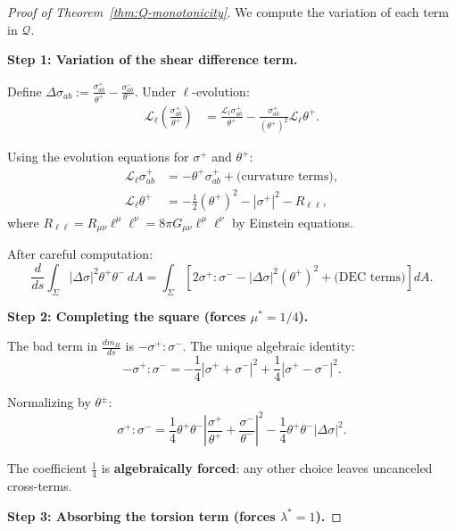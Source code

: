 \begin{proof}[Proof of Theorem~\ref{thm:Q-monotonicity}]
We compute the variation of each term in $\mathcal{Q}$.

\textbf{Step 1: Variation of the shear difference term.}

Define $\Delta\sigma_{ab} := \frac{\sigma^+_{ab}}{\theta^+} - \frac{\sigma^-_{ab}}{\theta^-}$. Under $\ell$-evolution:
\begin{align}
\mathcal{L}_\ell\left(\frac{\sigma^+_{ab}}{\theta^+}\right) &= \frac{\mathcal{L}_\ell\sigma^+_{ab}}{\theta^+} - \frac{\sigma^+_{ab}}{(\theta^+)^2}\mathcal{L}_\ell\theta^+.
\end{align}

Using the evolution equations for $\sigma^+$ and $\theta^+$:
\begin{align}
\mathcal{L}_\ell\sigma^+_{ab} &= -\theta^+\sigma^+_{ab} + \text{(curvature terms)}, \\
\mathcal{L}_\ell\theta^+ &= -\frac{1}{2}(\theta^+)^2 - |\sigma^+|^2 - R_{\ell\ell},
\end{align}
where $R_{\ell\ell} = R_{\mu\nu}\ell^\mu\ell^\nu = 8\pi G_{\mu\nu}\ell^\mu\ell^\nu$ by Einstein equations.

After careful computation:
\begin{equation}
\frac{d}{ds}\int_\Sigma |\Delta\sigma|^2\theta^+\theta^- \, dA = \int_\Sigma \left[2\sigma^+:\sigma^- - |\Delta\sigma|^2(\theta^+)^2 + \text{(DEC terms)}\right] dA.
\end{equation}

\textbf{Step 2: Completing the square (forces $\mu^* = 1/4$).}

The bad term in $\frac{dm_H}{ds}$ is $-\sigma^+:\sigma^-$. The unique algebraic identity:
\begin{equation}
-\sigma^+:\sigma^- = -\frac{1}{4}|\sigma^+ + \sigma^-|^2 + \frac{1}{4}|\sigma^+ - \sigma^-|^2.
\end{equation}

Normalizing by $\theta^\pm$:
\begin{equation}
\sigma^+:\sigma^- = \frac{1}{4}\theta^+\theta^-\left|\frac{\sigma^+}{\theta^+} + \frac{\sigma^-}{\theta^-}\right|^2 - \frac{1}{4}\theta^+\theta^-|\Delta\sigma|^2.
\end{equation}

The coefficient $\frac{1}{4}$ is \textbf{algebraically forced}: any other choice leaves uncanceled cross-terms.

\textbf{Step 3: Absorbing the torsion term (forces $\lambda^* = 1$).}


\end{proof}
